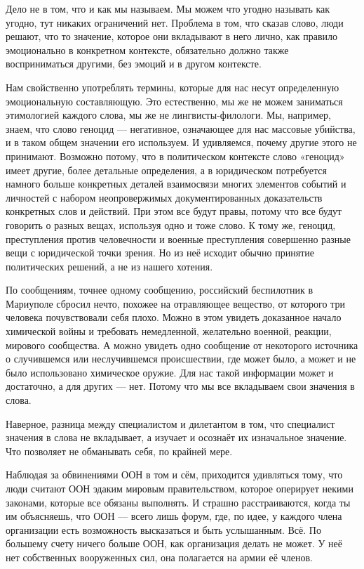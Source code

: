 Дело не в том, что и как мы называем. Мы можем что угодно называть как угодно,
тут никаких ограничений нет. Проблема в том, что сказав слово, люди решают, что
то значение, которое они вкладывают в него лично, как правило эмоционально в
конкретном контексте, обязательно должно также восприниматься другими, без
эмоций и в другом контексте.

Нам свойственно употреблять термины, которые для нас несут определенную
эмоциональную составляющую. Это естественно, мы же не можем заниматься
этимологией каждого слова, мы же не лингвисты-филологи. Мы, например, знаем,
что слово геноцид — негативное, означающее для нас массовые убийства, и в таком
общем значении его используем. И удивляемся, почему другие этого не принимают.
Возможно потому, что в политическом контексте слово «геноцид» имеет другие,
более детальные определения, а в юридическом потребуется намного больше
конкретных деталей взаимосвязи многих элементов событий и личностей с набором
неопровержимых документированных доказательств конкретных слов и действий. При
этом все будут правы, потому что все будут говорить о разных вещах, используя
одно и тоже слово. К тому же, геноцид, преступления против человечности и
военные преступления совершенно разные вещи с юридической точки зрения. Но из
неё исходит обычно принятие политических решений, а не из нашего хотения.

По сообщениям, точнее одному сообщению, российский беспилотник в Мариуполе
сбросил нечто, похожее на отравляющее вещество, от которого три человека
почувствовали себя плохо. Можно в этом увидеть доказанное начало химической
войны и требовать немедленной, желательно военной, реакции, мирового
сообщества. А можно увидеть одно сообщение от некоторого источника о
случившемся или неслучившемся происшествии, где может было, а может и не было
использовано химическое оружие. Для нас такой информации может и достаточно, а
для других — нет. Потому что мы все вкладываем свои значения в слова.

Наверное, разница между специалистом и дилетантом в том, что специалист
значения в слова не вкладывает, а изучает и осознаёт их изначальное значение.
Что позволяет не обманывать себя, по крайней мере.

Наблюдая за обвинениями ООН в том и сём, приходится удивляться тому, что люди
считают ООН эдаким мировым правительством, которое оперирует некими законами,
которые все обязаны выполнять. И страшно расстраиваются, когда ты им
объясняешь, что ООН — всего лишь форум, где, по идее, у каждого члена
организации есть возможность высказаться и быть услышанным. Всё. По большему
счету ничего больше ООН, как организация делать не может. У неё нет собственных
вооруженных сил, она полагается на армии её членов.

